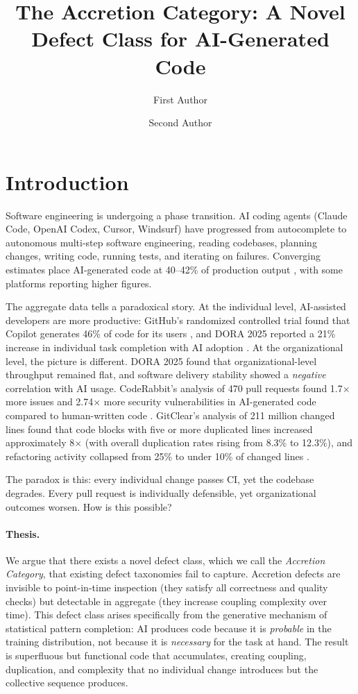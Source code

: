 \documentclass[11pt, a4paper, logo, copyright]{googledeepmind}
\title{The Accretion Category: A Novel Defect Class for AI-Generated Code}
\author[1]{First Author}
\author[1]{Second Author}
\affil[]{Pragnition Labs}
\affil[1]{Affiliation 1}
\begin{document}
\maketitle

\section{Introduction}
\label{sec:intro}

Software engineering is undergoing a phase transition. AI coding agents (Claude Code, OpenAI Codex, Cursor, Windsurf) have progressed from autocomplete to autonomous multi-step software engineering, reading codebases, planning changes, writing code, running tests, and iterating on failures. Converging estimates place AI-generated code at 40--42\% of production output \citep{gitclear2025, sonar2026}, with some platforms reporting higher figures.

The aggregate data tells a paradoxical story. At the individual level, AI-assisted developers are more productive: GitHub's randomized controlled trial found that Copilot generates 46\% of code for its users \citep{github2024rct}, and DORA 2025 reported a 21\% increase in individual task completion with AI adoption \citep{dora2025}. At the organizational level, the picture is different. DORA 2025 found that organizational-level throughput remained flat, and software delivery stability showed a \emph{negative} correlation with AI usage. CodeRabbit's analysis of 470 pull requests found 1.7$\times$ more issues and 2.74$\times$ more security vulnerabilities in AI-generated code compared to human-written code \citep{coderabbit2025}. GitClear's analysis of 211 million changed lines found that code blocks with five or more duplicated lines increased approximately 8$\times$ (with overall duplication rates rising from 8.3\% to 12.3\%), and refactoring activity collapsed from 25\% to under 10\% of changed lines \citep{gitclear2025}.

The paradox is this: every individual change passes CI, yet the codebase degrades. Every pull request is individually defensible, yet organizational outcomes worsen. How is this possible?

\paragraph{Thesis.} We argue that there exists a novel defect class, which we call the \emph{Accretion Category}, that existing defect taxonomies fail to capture. Accretion defects are invisible to point-in-time inspection (they satisfy all correctness and quality checks) but detectable in aggregate (they increase coupling complexity over time). This defect class arises specifically from the generative mechanism of statistical pattern completion: AI produces code because it is \emph{probable} in the training distribution, not because it is \emph{necessary} for the task at hand. The result is superfluous but functional code that accumulates, creating coupling, duplication, and complexity that no individual change introduces but the collective sequence produces.
\end{document}
